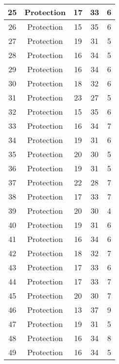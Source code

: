 \documentclass[results.tex]{subfiles}
\begin{document}
\begin{center}
\begin{tabular}{| c || c | c | c | c |}
    \hline
    25 & Protection & 17 & 33 & 6 \\ 
    \hline
    26 & Protection & 15 & 35 & 6 \\ 
    \hline
    27 & Protection & 19 & 31 & 5 \\ 
    \hline
    28 & Protection & 16 & 34 & 5 \\ 
    \hline
    29 & Protection & 16 & 34 & 6 \\ 
    \hline
    30 & Protection & 18 & 32 & 6 \\ 
    \hline
    31 & Protection & 23 & 27 & 5 \\ 
    \hline
    32 & Protection & 15 & 35 & 6 \\ 
    \hline
    33 & Protection & 16 & 34 & 7 \\ 
    \hline
    34 & Protection & 19 & 31 & 6 \\ 
    \hline
    35 & Protection & 20 & 30 & 5 \\ 
    \hline
    36 & Protection & 19 & 31 & 5 \\ 
    \hline
    37 & Protection & 22 & 28 & 7 \\ 
    \hline
    38 & Protection & 17 & 33 & 7 \\ 
    \hline
    39 & Protection & 20 & 30 & 4 \\ 
    \hline
    40 & Protection & 19 & 31 & 6 \\ 
    \hline
    41 & Protection & 16 & 34 & 6 \\ 
    \hline
    42 & Protection & 18 & 32 & 7 \\ 
    \hline
    43 & Protection & 17 & 33 & 6 \\ 
    \hline
    44 & Protection & 17 & 33 & 7 \\ 
    \hline
    45 & Protection & 20 & 30 & 7 \\ 
    \hline
    46 & Protection & 13 & 37 & 9 \\ 
    \hline
    47 & Protection & 19 & 31 & 5 \\ 
    \hline
    48 & Protection & 16 & 34 & 8 \\ 
    \hline
    49 & Protection & 16 & 34 & 5 \\ 
    \hline   \end{tabular}
\end{center}
\end{document}
